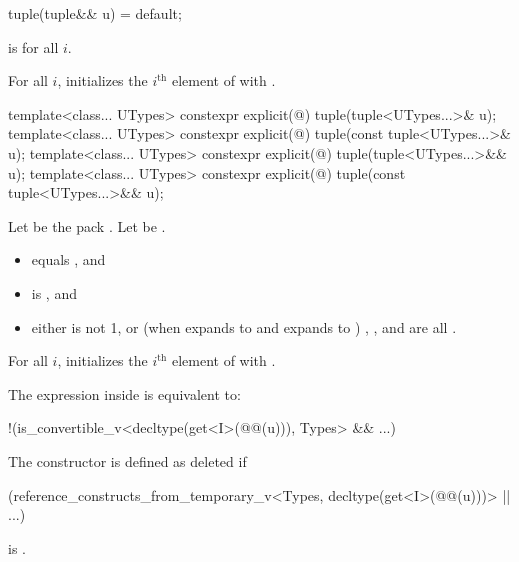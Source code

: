 %
\begin{itemdecl}
tuple(tuple&& u) = default;
\end{itemdecl}

\begin{itemdescr}
\pnum
\constraints
{} is  for all $i$.

\pnum
\effects
For all $i$, initializes the $i^\text{th}$ element of  with
.
\end{itemdescr}

%
\begin{itemdecl}
template<class... UTypes> constexpr explicit(@\seebelow@) tuple(tuple<UTypes...>& u);
template<class... UTypes> constexpr explicit(@\seebelow@) tuple(const tuple<UTypes...>& u);
template<class... UTypes> constexpr explicit(@\seebelow@) tuple(tuple<UTypes...>&& u);
template<class... UTypes> constexpr explicit(@\seebelow@) tuple(const tuple<UTypes...>&& u);
\end{itemdecl}

\begin{itemdescr}
\pnum
Let  be the pack .\newline
Let  be .

\pnum
\constraints
\begin{itemize}
\item
{} equals , and
\item
{}
is , and
\item
either  is not 1, or
(when  expands to  and
 expands to )
,
, and
 are all .
\end{itemize}

\pnum
\effects
For all $i$, initializes the $i^\textrm{th}$ element of 
with .

\pnum
\remarks
The expression inside  is equivalent to:
\begin{codeblock}
!(is_convertible_v<decltype(get<I>(@@(u))), Types> && ...)
\end{codeblock}
The constructor is defined as deleted if
\begin{codeblock}
(reference_constructs_from_temporary_v<Types, decltype(get<I>(@@(u)))> || ...)
\end{codeblock}
is .
\end{itemdescr}

